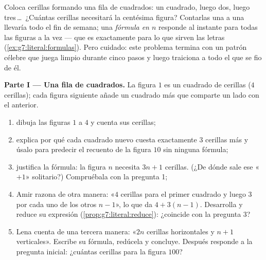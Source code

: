\begin{problem}
\label{pb:g7:literal:1}
Coloca cerillas formando una fila de cuadrados: un cuadrado, luego dos, luego
tres\,\dots\ ¿Cuántas cerillas necesitará la centésima figura?
Contarlas una a una llevaría todo el fin de semana; una \emph{fórmula
en $n$} responde al instante para todas las figuras a la vez --- que es
exactamente para lo que sirven las letras
(\cref{ex:g7:literal:formulas}). Pero cuidado: este problema termina
con un patrón célebre que juega limpio durante cinco pasos y luego
traiciona a todo el que se fio de él.

\medskip
\noindent\textbf{Parte I --- Una fila de cuadrados.}
La figura $1$ es un cuadrado de cerillas ($4$ cerillas); cada figura
siguiente añade un cuadrado más que comparte un lado con el anterior.
\begin{enumerate}
  \item dibuja las figuras $1$ a $4$ y cuenta sus cerillas;
  \item explica por qué cada cuadrado nuevo cuesta exactamente $3$ cerillas
        más y úsalo para predecir el recuento de la figura
        $10$ sin ninguna fórmula;
  \item justifica la fórmula: la figura $n$ necesita $3n + 1$ cerillas.
        (¿De dónde sale ese «$+1$» solitario?) Compruébala
        con la pregunta 1;
  \item Amir razona de otra manera: «$4$ cerillas para el primer
        cuadrado y luego $3$ por cada uno de los otros $n - 1$», lo que da
        $4 + 3(n - 1)$. Desarrolla y reduce su expresión
        (\cref{prop:g7:literal:reduce}): ¿coincide con la
        pregunta 3?
  \item Lena cuenta de una tercera manera: «$2n$ cerillas horizontales y
        $n + 1$ verticales». Escribe su fórmula, redúcela
        y concluye. Después responde a la pregunta inicial: ¿cuántas
        cerillas para la figura $100$?
\end{enumerate}


\end{problem}

